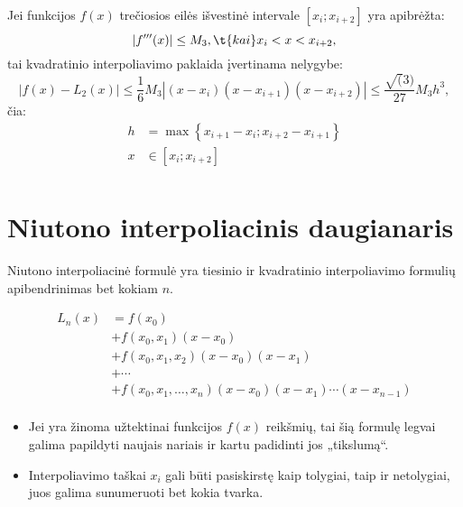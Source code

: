\begin{prop}
  Jei funkcijos $f(x)$ trečiosios eilės išvestinė intervale
  $\left[ x_{i}; x_{i+2} \right]$ yra apibrėžta:
  \begin{equation*}
    |f'''(x)| \leq M_{3}, \t{ kai } x_{i} < x < x_{i+2},
  \end{equation*}
  tai kvadratinio interpoliavimo paklaida įvertinama nelygybe:
  \begin{equation*}
    |f(x) - L_{2}(x)|
      \leq \frac{1}{6}M_{3}|(x-x_{i})(x-x_{i+1})(x-x_{i+2})|
      \leq \frac{\sqrt(3)}{27}M_{3}h^{3},
  \end{equation*}
  čia:
  \begin{align*}
    h &= \max \left\{ x_{i+1} - x_{i}; x_{i+2} - x_{i+1} \right\} \\
    x &\in \left[ x_{i}; x_{i+2} \right] \\
  \end{align*}
\end{prop}


\section{Niutono interpoliacinis daugianaris}

\cite[168-169]{textbook}


Niutono interpoliacinė formulė yra tiesinio ir kvadratinio interpoliavimo
formulių apibendrinimas bet kokiam $n$.

\begin{defn}
  \begin{align*}
    L_{n}(x)
      &= f(x_{0}) \\
      &+ f(x_{0},x_{1})(x - x_{0}) \\
      &+ f(x_{0},x_{1},x_{2})(x-x_{0})(x-x_{1}) \\
      &+ \cdots \\
      &+ f(x_{0},x_{1},\ldots,x_{n})(x-x_{0})(x-x_{1})\cdots(x-x_{n-1}) \\
  \end{align*}
\end{defn}
\begin{itemize}
  \item Jei yra žinoma užtektinai funkcijos $f(x)$ reikšmių, tai šią formulę
    legvai galima papildyti naujais nariais ir kartu padidinti jos „tikslumą“.
  \item Interpoliavimo taškai $x_{i}$ gali būti pasiskirstę kaip tolygiai,
    taip ir netolygiai, juos galima sunumeruoti bet kokia tvarka.
\end{itemize}

